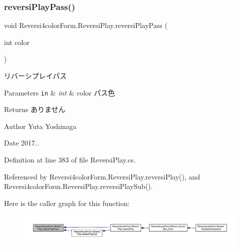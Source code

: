 \subsubsection{\texorpdfstring{reversi\+Play\+Pass()}{reversiPlayPass()}}
{\footnotesize\ttfamily void Reversi4color\+Form.\+Reversi\+Play.\+reversi\+Play\+Pass (\begin{DoxyParamCaption}\item[{int}]{color }\end{DoxyParamCaption})}



リバーシプレイパス 


\begin{DoxyParams}[1]{Parameters}
\mbox{\tt in}  & {\em int} & color パス色 \\
\hline
\end{DoxyParams}
\begin{DoxyReturn}{Returns}
ありません 
\end{DoxyReturn}
\begin{DoxyAuthor}{Author}
Yuta Yoshinaga 
\end{DoxyAuthor}
\begin{DoxyDate}{Date}
2017.. 
\end{DoxyDate}


Definition at line 383 of file Reversi\+Play.\+cs.



Referenced by Reversi4color\+Form.\+Reversi\+Play.\+reversi\+Play(), and Reversi4color\+Form.\+Reversi\+Play.\+reversi\+Play\+Sub().

Here is the caller graph for this function\+:
\nopagebreak
\begin{figure}[H]
\begin{center}
\leavevmode
\includegraphics[width=350pt]{class_reversi4color_form_1_1_reversi_play_a47c3f277e5f480d6a5af1ca7b3a667f4_icgraph}
\end{center}
\end{figure}
\mbox{\label{class_reversi4color_form_1_1_reversi_play_a92b619d3fb9e1fbbb36b6b60f6dee422}} 
